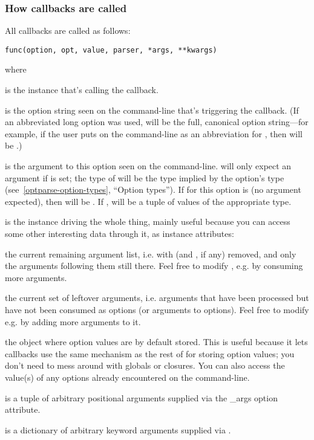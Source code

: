 \subsubsection{How callbacks are called\label{optparse-callbacks-called}}

All callbacks are called as follows:

\begin{verbatim}
func(option, opt, value, parser, *args, **kwargs)
\end{verbatim}

where

\begin{definitions}
is the  instance that's calling the callback.

is the option string seen on the command-line that's triggering the
callback.  (If an abbreviated long option was used,  will be
the full, canonical option string---for example, if the user puts
 on the command-line as an abbreviation for
, then  will be
.)

is the argument to this option seen on the command-line.
 will only expect an argument if  is
set; the type of  will be the type implied by the
option's type (see~\ref{optparse-option-types}, ``Option types'').  If
 for this option is  (no argument expected), then
 will be .  If ,  will
be a tuple of values of the appropriate type.

is the  instance driving the whole thing, mainly
useful because you can access some other interesting data through it,
as instance attributes:

\begin{definitions}
the current remaining argument list, i.e. with  (and
, if any) removed, and only the arguments following
them still there.  Feel free to modify ,
e.g. by consuming more arguments.
    
the current set of leftover arguments, i.e. arguments that have been
processed but have not been consumed as options (or arguments to
options).  Feel free to modify  e.g. by adding
more arguments to it.
    
the object where option values are by default stored.  This is useful
because it lets callbacks use the same mechanism as the rest of
 for storing option values; you don't need to mess
around with globals or closures.  You can also access the value(s) of
any options already encountered on the command-line.
\end{definitions}

is a tuple of arbitrary positional arguments supplied via the
_args option attribute.

is a dictionary of arbitrary keyword arguments supplied via
.
\end{definitions}

